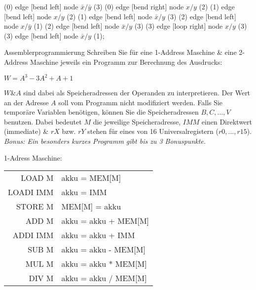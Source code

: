 \documentclass{article}
\begin{document}
\begin{solution}
\begin{enumerate}
{            
            (0) edge [bend left] node {$\bar x/\bar y$} (3)
            (0) edge [bend right] node {$x/y$} (2)
            (1) edge [bend left] node {$x/y$} (2)
            (1) edge [bend left] node {$\bar x/y$} (3)
            (2) edge [bend left] node {$x/\bar y$} (1)
            (2) edge [bend left] node {$\bar x/y$} (3)
            (3) edge [loop right] node {$x/y$} (3)
            (3) edge [bend left] node {$\bar x/y$} (1);
          }
  \end{enumerate}
\end{solution}

\begin{exercise}{Assemblerprogrammierung}
  Schreiben Sie für eine 1-Address Maschine \& eine 2-Address Maschine jeweils ein Programm zur Berechnung des Ausdrucks:\par
  \begin{center}$W = A^3 - 3A^2 + A + 1$\end{center}
  $W$\&$A$ sind dabei als Speicheradressen der Operanden zu interpretieren. Der Wert an der Adresse $A$ soll vom Programm nicht modifiziert werden. Falls Sie temporäre Variablen benötigen, können Sie die Speicheradressen $B, C, ..., V$ benutzen. Dabei bedeutet $M$ die jeweilige Speicheradresse, $IMM$ einen Direktwert (immediate) \& $rX$ bzw. $rY$ stehen für eines von 16 Universalregistern ($r0, ..., r15$).\\
  \textit{Bonus: Ein besonders kurzes Programm gibt bis zu 3 Bonuspunkte.}
  \begin{multicols}{2}
    1-Adress Maschine:\par
    \begin{tabular}{|r|l|}
      \hline
      LOAD M    & akku = MEM[M]        \\
      LOADI IMM & akku = IMM           \\
      STORE M   & MEM[M] = akku        \\
      ADD M     & akku = akku + MEM[M] \\
      ADDI IMM  & akku = akku + IMM    \\
      SUB M     & akku = akku - MEM[M] \\
      MUL M     & akku = akku * MEM[M] \\
      DIV M     & akku = akku / MEM[M] \\
      \hline
    \end{tabular}
    \columnbreak


\end{multicols}
\end{exercise}
\end{document}
